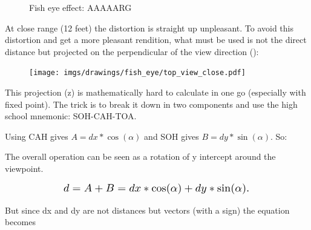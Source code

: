  \begin{figure}[H]
\centering
 \caption{Fish eye effect: AAAAARG} \label{fig:mips}
 \end{figure}
 

\begin{minipage}{.5\textwidth}
At close range (12 feet) the distortion is straight up unpleasant. To avoid this distortion and get a more pleasant rendition, what must be used is not the direct distance  but  projected on the perpendicular of the view direction ():
 \end{minipage}
\begin{minipage}{.5\textwidth}
 \begin{figure}[H]
  \begin{flushright}
  \texttt{[image: imgs/drawings/fish\_eye/top\_view\_close.pdf]}
 \end{flushright}
\end{figure}
 \end{minipage}

\par



\begin{figure}[H]

 
\label{fig:Raycasting2}
 
\end{figure}

This projection (z) is mathematically hard to calculate in one go (especially with fixed point). The trick is to break it down in two components and use the high school mnemonic: SOH-CAH-TOA.\\


\begin{figure}[H]
\centering
 
 
\end{figure}
Using CAH gives $A = dx * \cos(\alpha)$ and SOH gives $B = dy * \sin(\alpha) $. So:



The overall operation can be seen as a rotation of y intercept around the viewpoint.
\par
\begin{figure}[H]
  \centering
  \begin{equation*}
    \scalebox{1.3}{
$d = A + B = dx * \cos(\alpha) + dy * \sin(\alpha) $. 
 }
  \end{equation*}
\end{figure}
But since dx and dy are not distances but vectors (with a sign) the equation becomes 


